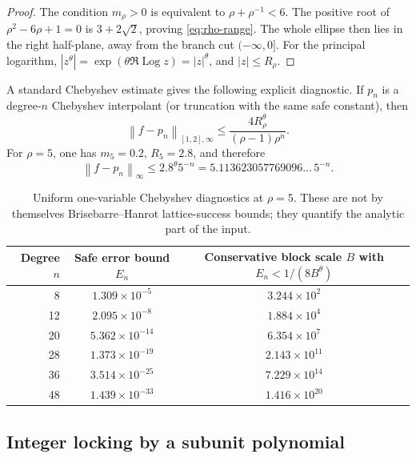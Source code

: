 \documentclass[11pt,oneside]{article}
\theoremstyle{definition}
\theoremstyle{remark}
\newcommand{\Log}{\operatorname{Log}}
\newcommand{\tht}{\theta}
\newcommand{\norm}[1]{\left\lVert#1\right\rVert}
\begin{document}
\begin{proof}
The condition $m_\rho>0$ is equivalent to
$\rho+\rho^{-1}<6$.  The positive root of $\rho^2-6\rho+1=0$ is $3+2\sqrt2$, proving
\eqref{eq:rho-range}.  The whole ellipse then lies in the right half-plane, away from the
branch cut $(-\infty,0]$.  For the principal logarithm,
$|z^\tht|=\exp(\tht\Re\Log z)=|z|^\tht$, and $|z|\le R_\rho$.
\end{proof}

A standard Chebyshev estimate gives the following explicit diagnostic.  If $p_n$ is a degree-$n$
Chebyshev interpolant (or truncation with the same safe constant), then
\begin{equation}
  \norm{f-p_n}_{[1,2],\infty}
  \le \frac{4R_\rho^\tht}{(\rho-1)\rho^n}.
  \label{eq:cheb-error}
\end{equation}
For $\rho=5$, one has $m_5=0.2$, $R_5=2.8$, and therefore
\begin{equation}
  \norm{f-p_n}_\infty\le 2.8^\tht 5^{-n}
  =5.113623057769096\ldots\,5^{-n}.
  \label{eq:rho5-error}
\end{equation}

\begin{table}[ht]
\centering
\small
\begin{tabular}{rcc}
\toprule
Degree $n$ & Safe error bound $E_n$ & Conservative block scale $B$ with $E_n<1/(8B^\tht)$ \\
\midrule
8  & $1.309\times10^{-5}$  & $3.244\times10^{2}$ \\
12 & $2.095\times10^{-8}$  & $1.884\times10^{4}$ \\
20 & $5.362\times10^{-14}$ & $6.354\times10^{7}$ \\
28 & $1.373\times10^{-19}$ & $2.143\times10^{11}$ \\
36 & $3.514\times10^{-25}$ & $7.229\times10^{14}$ \\
48 & $1.439\times10^{-33}$ & $1.416\times10^{20}$ \\
\bottomrule
\end{tabular}
\caption{Uniform one-variable Chebyshev diagnostics at $\rho=5$.  These are not by themselves
Brisebarre--Hanrot lattice-success bounds; they quantify the analytic part of the input.}
\label{tab:cheb}
\end{table}

\subsection{Integer locking by a subunit polynomial}
\end{document}
